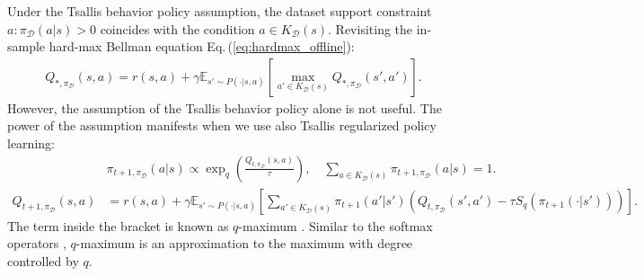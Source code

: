 \documentclass{article}
\newcommand{\AdaBracket}[1]{\left(#1\right)}
\newcommand{\AdaRectBracket}[1]{\left[#1\right]}
\newcommand{\expectation}[2]{\mathbb{E}_{#1}\AdaRectBracket{#2}}
\newcommand{\eq}[1]{Eq.\,(#1)}
\newcommand{\datasetOptimalQ}{Q_{*, \pi_{\mathcal{D}}}}
\newcommand{\datasetPolicy}{\pi_{\mathcal{D}}}
\begin{document}
Under the Tsallis behavior policy assumption, the dataset support constraint $a: \datasetPolicy(a|s) > 0$ coincides with the condition $a \in K_{\mathcal{D}}(s)$.
Revisiting the in-sample hard-max Bellman equation \eq{\ref{eq:hardmax_offline}}:
\begin{align*}
    \datasetOptimalQ(s,a) = r(s,a) + \gamma \expectation{s'\sim P(\cdot | s,a)}{\max_{a'\in K_{\mathcal{D}}(s)} \datasetOptimalQ(s',a')}.
\end{align*}
However, the assumption of the Tsallis behavior policy alone is not useful.
The power of the assumption manifests when we use also Tsallis regularized policy learning:
\begin{align}
    & \pi_{t+1, \datasetPolicy}(a|s) \propto \exp_q\AdaBracket{\frac{Q_{t, \datasetPolicy}(s,a)}{\tau}},  \quad \sum_{a\in K_{\mathcal{D}}(s)} \pi_{t+1, \datasetPolicy} (a|s) = 1.\\
    Q_{t+1, \datasetPolicy}(s,a) &= r(s,a) +  \gamma \expectation{s'\sim P(\cdot | s,a)}{ \sum_{a' \in K_{\mathcal{D}}(s)} \!\!\!\!\! \pi_{t+1}(a'|s') \AdaBracket{Q_{t, \datasetPolicy}(s',a') - \tau S_q(\pi_{t+1}(\cdot|s'))}}.
    \label{eq:proposal_policy}
\end{align}
The term inside the bracket is known as $q$-maximum \cite{Lee2020-generalTsallisRSS}.
Similar to the softmax operators \cite{asadi17a,azar2012dynamic}, $q$-maximum is an approximation to the maximum with degree controlled by $q$.
\end{document}

